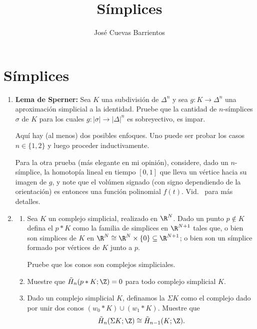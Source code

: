 \documentclass[11pt, reqno]{amsart}
\title{Símplices}
\date{\DTMdate{2026-09-10}}
\author{José Cuevas Barrientos}
\begin{document}
\maketitle

\section{Símplices}
\begin{enumerate}
	\item \textbf{Lema de Sperner:}
		Sea $K$ una subdivisión de $\Delta^n$ y sea $g \colon K \to \Delta^n$ una aproximación simplicial a la identidad.
		Pruebe que la cantidad de $n$-símplices $\sigma$ de $K$ para los cuales $g\colon |\sigma| \to |\Delta|^n$ es sobreyectivo, es impar.

		\begin{hint}
			Aquí hay (al menos) dos posibles enfoques.
			Uno puede ser probar los casos $n \in \{ 1, 2 \}$ y luego proceder inductivamente.

			Para la otra prueba (más elegante en mi opinión), considere, dado un $n$-símplice, la homotopía lineal en tiempo
			$[0, 1]$ que lleva un vértice hacia su imagen de $g$, y note que el volúmen signado (con signo dependiendo de la
			orientación) es entonces una función polinomial $f(t)$.
			Vid.\ \cite{mclennan2008sperner} para más detalles.
		\end{hint}

	\item
		\begin{enumerate}
			\item Sea $K$ un complejo simplicial, realizado en $\R^N$.
				Dado un punto $p \notin K$ defina el  $p * K$ como la familia de simplices en $\R^{N+1}$ tales
				que, o bien son simplices de $K$ en $\R^N \cong \R^N \times \{ 0 \} \subseteq \R^{N+1}$; o bien son un
				símplice formado por vértices de $K$ junto a $p$.

				Pruebe que los conos son complejos simpliciales.

			\item Muestre que $\tilde H_n(p * K; \Z) = 0$ para todo complejo simplicial $K$.

			\item Dado un complejo simplicial $K$, definamos la  $\Sigma K$ como el complejo dado por unir
				dos conos $(w_0 * K) \cup (w_1 * K)$.
				Muestre que
				\[
					\tilde H_n(\Sigma K; \Z) \cong \tilde H_{n-1}(K; \Z).
				\]
		\end{enumerate}


\end{enumerate}
\end{document}
